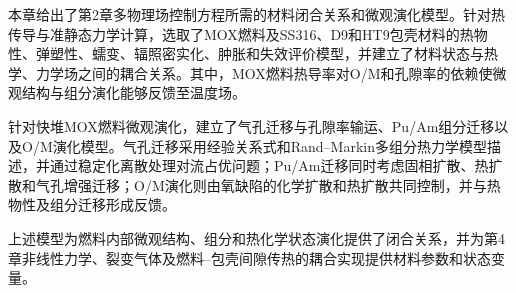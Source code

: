 \label{sec:ch3_summary}

本章给出了第2章多物理场控制方程所需的材料闭合关系和微观演化模型。针对热传导与准静态力学计算，选取了MOX燃料及SS316、D9和HT9包壳材料的热物性、弹塑性、蠕变、辐照密实化、肿胀和失效评价模型，并建立了材料状态与热学、力学场之间的耦合关系。其中，MOX燃料热导率对O/M和孔隙率的依赖使微观结构与组分演化能够反馈至温度场。

针对快堆MOX燃料微观演化，建立了气孔迁移与孔隙率输运、Pu/Am组分迁移以及O/M演化模型。气孔迁移采用经验关系式和Rand--Markin多组分热力学模型描述，并通过稳定化离散处理对流占优问题；Pu/Am迁移同时考虑固相扩散、热扩散和气孔增强迁移；O/M演化则由氧缺陷的化学扩散和热扩散共同控制，并与热物性及组分迁移形成反馈。

上述模型为燃料内部微观结构、组分和热化学状态演化提供了闭合关系，并为第4章非线性力学、裂变气体及燃料--包壳间隙传热的耦合实现提供材料参数和状态变量。


